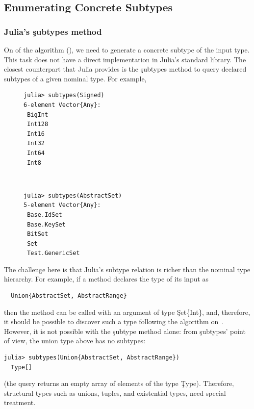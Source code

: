 \subsection{Enumerating Concrete Subtypes}%
\label{sec:approx:enu}

\subsubsection{Julia's \c{subtypes} method}

On  of the algorithm (), we need to generate a
concrete subtype of the input type. This task does not have a direct
implementation in Julia's standard library. The closest counterpart that Julia
provides is the \c{subtypes} method to query declared subtypes of a given
nominal type. For example,
\begin{figure}[h]
\begin{minipage}{.49\textwidth}
\begin{lstlisting}[style=jterm]
julia> subtypes(Signed)
6-element Vector{Any}:
 BigInt
 Int128
 Int16
 Int32
 Int64
 Int8
\end{lstlisting}
\end{minipage}
~
\begin{minipage}{.49\textwidth}
\begin{lstlisting}[style=jterm]
julia> subtypes(AbstractSet)
5-element Vector{Any}:
 Base.IdSet
 Base.KeySet
 BitSet
 Set
 Test.GenericSet

\end{lstlisting}
\end{minipage}
\end{figure}

The challenge here is that Julia's subtype relation is richer than the
nominal type hierarchy. For example, if a method declares the type of its input
as
\begin{lstlisting}
  Union{AbstractSet, AbstractRange}
\end{lstlisting}
then the method can be called with an argument of type \c{Set\{Int\}}, and,
therefore, it should be possible to discover such a type following the algorithm
on~. However, it is not possible with the \c{subtype} method alone:
from \c{subtypes}' point of view, the union type above has no subtypes:
\begin{lstlisting}[style=jterm]
  julia> subtypes(Union{AbstractSet, AbstractRange})
  Type[]
\end{lstlisting}
(the query returns an empty array of elements of the type \c{Type}).
Therefore, structural types %
such as unions,
tuples, and existential types, need special treatment.

